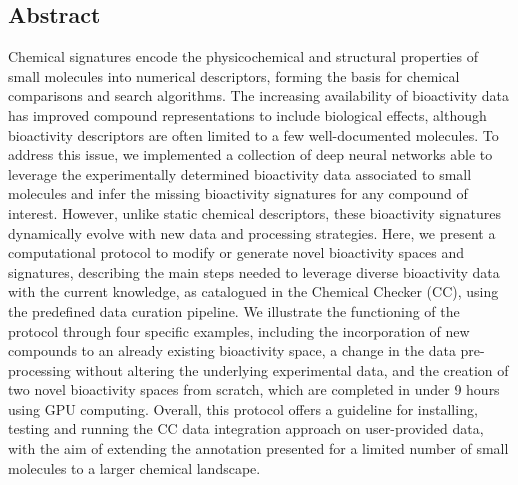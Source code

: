 \subsection{Abstract}

Chemical signatures encode the physicochemical and structural properties of small molecules into numerical descriptors, forming the basis for chemical comparisons and search algorithms. The increasing availability of bioactivity data has improved compound representations to include biological effects, although bioactivity descriptors are often limited to a few well-documented molecules. To address this issue, we implemented a collection of deep neural networks able to leverage the experimentally determined bioactivity data associated to small molecules and infer the missing bioactivity signatures for any compound of interest. However, unlike static chemical descriptors, these bioactivity signatures dynamically evolve with new data and processing strategies. Here, we present a computational protocol to modify or generate novel bioactivity spaces and signatures, describing the main steps needed to leverage diverse bioactivity data with the current knowledge, as catalogued in the Chemical Checker (CC), using the predefined data curation pipeline. We illustrate the functioning of the protocol through four specific examples, including the incorporation of new compounds to an already existing bioactivity space, a change in the data pre-processing without altering the underlying experimental data, and the creation of two novel bioactivity spaces from scratch, which are completed in under 9 hours using GPU computing. Overall, this protocol offers a guideline for installing, testing and running the CC data integration approach on user-provided data, with the aim of extending the annotation presented for a limited number of small molecules to a larger chemical landscape.